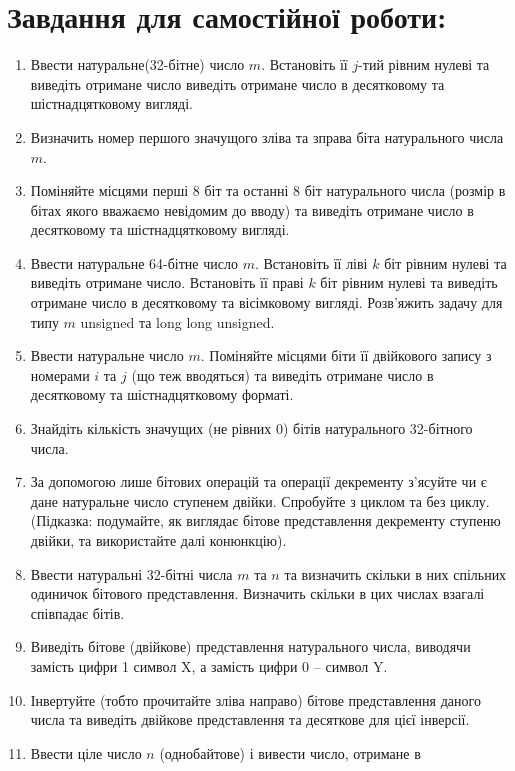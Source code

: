 \documentclass[a5paper,titlepage,openany,twoside,
]
{book_unv}%
\begin{document}
\section{Завдання для самостійної роботи:}

\begin{enumerate}
\def\labelenumi{\arabic{enumi})}
\setcounter{enumi}{7}
\item
  Ввести натуральне(32-бітне) число $m$. Встановіть її $j$-тий рівним нулеві
  та виведіть отримане число виведіть отримане число в десятковому та
  шістнадцятковому вигляді.
\item
  Визначить номер першого значущого зліва та зправа біта натурального
  числа $m$.
\item
  Поміняйте місцями перші 8 біт та останні 8 біт натурального числа
  (розмір в бітах якого вважаємо невідомим до вводу) та виведіть
  отримане число в десятковому та шістнадцятковому вигляді.
\item
  Ввести натуральне 64-бітне число $m$. Встановіть її ліві $k$ біт рівним
  нулеві та виведіть отримане число. Встановіть її праві $k$ біт рівним
  нулеві та виведіть отримане число в десятковому та вісімковому
  вигляді. Розв'яжить задачу для типу $m$ unsigned та long long unsigned.
\item
  Ввести натуральне число $m$. Поміняйте місцями біти її двійкового запису
  з номерами $i$ та $j$ (що теж вводяться) та виведіть отримане число в
  десятковому та шістнадцятковому форматі.
\item
  Знайдіть кількість значущих (не рівних 0) бітів натурального
  32-бітного числа.
\item
  За допомогою лише бітових операцій та операції декременту з'ясуйте чи є
  дане натуральне число ступенем двійки. Спробуйте з циклом та без
  циклу. (Підказка: подумайте, як виглядає бітове представлення
  декременту ступеню двійки, та використайте далі конюнкцію).
\item
  Ввести натуральні 32-бітні числа $m$ та $n$ та визначить скільки в них
  спільних одиничок бітового представлення. Визначить скільки в цих
  числах взагалі співпадає бітів.
\item
  Виведіть бітове (двійкове) представлення натурального числа, 
виводячи замість цифри 1 символ X, а замість цифри 0 -- символ Y.
\item
  Інвертуйте (тобто прочитайте зліва направо) бітове представлення
  даного числа та виведіть двійкове представлення та десяткове для цієї
  інверсії.
\item
  Ввести ціле число $n$ (однобайтове) і вивести число, отримане в

\end{enumerate}
\end{document}
